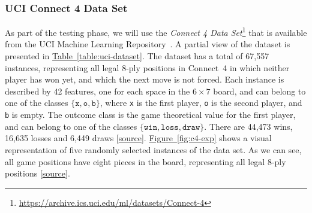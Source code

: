 \documentclass{article}
\newcommand{\GithubURL}[1]{[\href{https://github.com/davidrobles/mlnd-capstone-code/blob/master/#1}{source}]}
\newcommand{\URLUCI}{\url{https://archive.ics.uci.edu/ml/datasets/Connect-4}}
\begin{document}
\subsubsection{UCI Connect 4 Data Set}

As part of the testing phase, we will use the \emph{Connect 4 Data Set}\footnote{\URLUCI{}} that is
available from the UCI Machine Learning Repository~\citep{Hettich1998UCI}. A partial view of the
dataset is presented in \hyperref[table:uci-dataset]{Table~\ref*{table:uci-dataset}}. The dataset
has a total of 67,557 instances, representing all legal 8-ply positions in \mbox{Connect 4} in which
neither player has won yet, and which the next move is not forced. Each instance is described by 42
features, one for each space in the $6 \times 7$ board, and can belong to one of the classes
$\{\texttt{x}, \texttt{o}, \texttt{b}\}$, where \texttt{x} is the first player, \texttt{o} is the
second player, and \texttt{b} is empty. The outcome class is the game theoretical value for the
first player, and can belong to one of the classes $\{\texttt{win}, \texttt{loss}, \texttt{draw}\}$.
There are 44,473 wins, 16,635 losses and 6,449 draws \GithubURL{examples/c4_uci_data_expl.py}.
\hyperref[fig:c4-exp]{Figure~\ref*{fig:c4-exp}} shows a visual representation of five randomly
selected instances of the data set. As we can see, all game positions have eight pieces in the
board, representing all legal 8-ply positions \GithubURL{examples/c4_uci_viz.py}.

\end{document}

